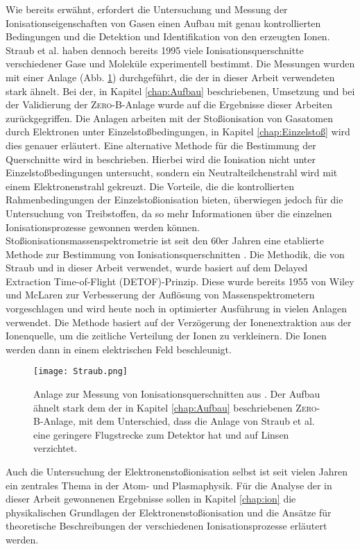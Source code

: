 Wie bereits erwähnt, erfordert die Untersuchung und Messung der Ionisationseigenschaften von Gasen einen Aufbau mit genau kontrollierten Bedingungen und die Detektion und Identifikation von den erzeugten Ionen. Straub et al. \cite{Straub,Straub2} haben dennoch bereits 1995 viele Ionisationsquerschnitte verschiedener Gase und Moleküle experimentell bestimmt. Die Messungen wurden mit einer Anlage (Abb. \ref{fig:Straub}) durchgeführt, die der in dieser Arbeit verwendeten stark ähnelt. Bei der, in Kapitel \ref{chap:Aufbau} beschriebenen, Umsetzung und bei der Validierung der \textsc{Zero-B}-Anlage wurde auf die Ergebnisse dieser Arbeiten zurückgegriffen. Die Anlagen arbeiten mit der Stoßionisation von Gasatomen durch Elektronen unter Einzelstoßbedingungen, in Kapitel \ref{chap:Einzelstoß} wird dies genauer erläutert. Eine alternative Methode für die Bestimmung der Querschnitte wird in \cite{other_method} beschrieben. Hierbei wird die Ionisation nicht unter Einzelstoßbedingungen untersucht, sondern ein Neutralteilchenstrahl wird mit einem Elektronenstrahl gekreuzt. Die Vorteile, die die kontrollierten Rahmenbedingungen der Einzelstoßionisation bieten, überwiegen jedoch für die Untersuchung von Treibstoffen, da so mehr Informationen über die einzelnen Ionisationsprozesse gewonnen werden können.
Stoßionisationsmassenspektrometrie ist seit den 60er Jahren eine etablierte Methode zur Bestimmung von Ionisationsquerschnitten \cite{EITOFMS}. Die Methodik, die von Straub  und in dieser Arbeit verwendet, wurde basiert auf dem Delayed Extraction Time-of-Flight (DETOF)-Prinzip. Diese wurde bereits 1955 von Wiley und McLaren zur Verbesserung der Auflösung von Massenspektrometern vorgeschlagen \cite{DETOF} und wird heute noch in optimierter Ausführung in vielen Anlagen verwendet. Die Methode basiert auf der Verzögerung der Ionenextraktion aus der Ionenquelle, um die zeitliche Verteilung der Ionen zu verkleinern. Die Ionen werden dann in einem elektrischen Feld beschleunigt.
\begin{figure}
    \centering
    \texttt{[image: Straub.png]}
    \caption[Anlage zur Messung von Ionisationsquerschnitten von Straub et al.]{Anlage zur Messung von Ionisationsquerschnitten aus \cite{Straub2}. Der Aufbau ähnelt stark dem der in Kapitel \ref{chap:Aufbau} beschriebenen \textsc{Zero-B}-Anlage, mit dem Unterschied, dass die Anlage von Straub et al. eine geringere Flugstrecke zum Detektor hat und auf Linsen verzichtet.}
    \label{fig:Straub}
\end{figure}
Auch die Untersuchung der Elektronenstoßionisation selbst ist seit vielen Jahren ein zentrales Thema in der Atom- und Plasmaphysik. Für die Analyse der in dieser Arbeit gewonnenen Ergebnisse sollen in Kapitel \ref{chap:ion} die physikalischen Grundlagen der Elektronenstoßionisation und die Ansätze für theoretische Beschreibungen der verschiedenen Ionisationsprozesse erläutert werden.